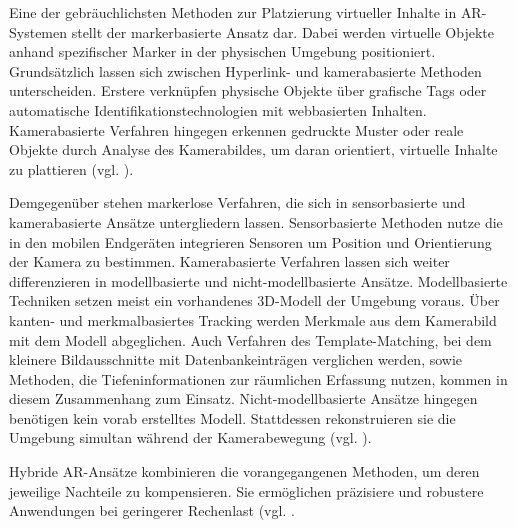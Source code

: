 Eine der gebräuchlichsten Methoden zur Platzierung virtueller Inhalte in \ac{AR}-Systemen stellt der markerbasierte Ansatz dar. 
Dabei werden virtuelle Objekte anhand spezifischer Marker in der physischen Umgebung positioniert. Grundsätzlich lassen sich zwischen Hyperlink- und kamerabasierte Methoden unterscheiden. Erstere verknüpfen physische Objekte über grafische Tags oder automatische Identifikationstechnologien mit webbasierten Inhalten. Kamerabasierte Verfahren hingegen erkennen gedruckte Muster oder reale Objekte durch Analyse des Kamerabildes, um daran orientiert, virtuelle Inhalte zu plattieren (vgl. \citealp[S. 3f]{el_barhoumi_assessment_2022}). 

Demgegenüber stehen markerlose Verfahren, die sich in sensorbasierte und kamerabasierte Ansätze untergliedern lassen. Sensorbasierte Methoden nutze die in den mobilen Endgeräten integrieren Sensoren um Position und Orientierung der Kamera zu bestimmen. Kamerabasierte Verfahren lassen sich weiter differenzieren in modellbasierte und nicht-modellbasierte Ansätze. Modellbasierte Techniken setzen meist ein vorhandenes \ac{3D}-Modell der Umgebung voraus. Über kanten- und merkmalbasiertes Tracking werden Merkmale aus dem Kamerabild mit dem Modell abgeglichen. Auch Verfahren des Template-Matching, bei dem kleinere Bildausschnitte mit Datenbankeinträgen verglichen werden, sowie Methoden, die Tiefeninformationen zur räumlichen Erfassung nutzen, kommen in diesem Zusammenhang zum Einsatz. Nicht-modellbasierte Ansätze hingegen benötigen kein vorab erstelltes Modell. Stattdessen rekonstruieren sie die Umgebung simultan während der Kamerabewegung (vgl. \citealp[S. 4f]{el_barhoumi_assessment_2022}).

Hybride \ac{AR}-Ansätze kombinieren die vorangegangenen Methoden, um deren jeweilige Nachteile zu kompensieren. Sie ermöglichen präzisiere und robustere Anwendungen bei geringerer Rechenlast (vgl. \citealp[S. 5]{el_barhoumi_assessment_2022}.